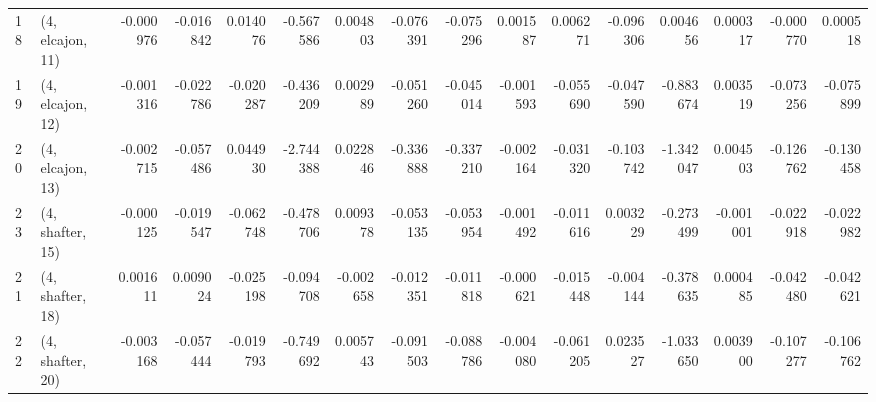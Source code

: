\begin{tabular}{llrrrrrrrrrrrrrr}
18 &  (4, elcajon, 11) &  -0.000976 & -0.016842 &  0.014076 &  -0.567586 &  0.004803 &  -0.076391 & -0.075296 &  0.001587 &  0.006271 & -0.096306 &   0.004656 &  0.000317 & -0.000770 &  0.000518 \\
19 &  (4, elcajon, 12) &  -0.001316 & -0.022786 & -0.020287 &  -0.436209 &  0.002989 &  -0.051260 & -0.045014 & -0.001593 & -0.055690 & -0.047590 &  -0.883674 &  0.003519 & -0.073256 & -0.075899 \\
20 &  (4, elcajon, 13) &  -0.002715 & -0.057486 &  0.044930 &  -2.744388 &  0.022846 &  -0.336888 & -0.337210 & -0.002164 & -0.031320 & -0.103742 &  -1.342047 &  0.004503 & -0.126762 & -0.130458 \\
23 &  (4, shafter, 15) &  -0.000125 & -0.019547 & -0.062748 &  -0.478706 &  0.009378 &  -0.053135 & -0.053954 & -0.001492 & -0.011616 &  0.003229 &  -0.273499 & -0.001001 & -0.022918 & -0.022982 \\
21 &  (4, shafter, 18) &   0.001611 &  0.009024 & -0.025198 &  -0.094708 & -0.002658 &  -0.012351 & -0.011818 & -0.000621 & -0.015448 & -0.004144 &  -0.378635 &  0.000485 & -0.042480 & -0.042621 \\
22 &  (4, shafter, 20) &  -0.003168 & -0.057444 & -0.019793 &  -0.749692 &  0.005743 &  -0.091503 & -0.088786 & -0.004080 & -0.061205 &  0.023527 &  -1.033650 &  0.003900 & -0.107277 & -0.106762 \\
\bottomrule
\end{tabular}
